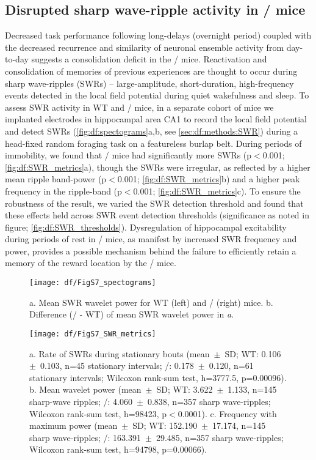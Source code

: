 \subsection{Disrupted sharp wave-ripple activity in \df/ mice}
\label{sec:df:results:SWR}
Decreased task performance following long-delays (overnight period) coupled with the decreased recurrence and similarity of neuronal ensemble activity from day-to-day suggests a consolidation deficit in the \df/ mice. Reactivation and consolidation of memories of previous experiences are thought to occur during sharp wave-ripples (SWRs) -- large-amplitude, short-duration, high-frequency events detected in the local field potential \citep{Buzsaki2015, Diba2007, Dupret2010a, Foster2006, Jadhav2012, Kudrimoti1999, Wilson1994} during quiet wakefulness and sleep. To assess SWR activity in WT and \df/ mice, in a separate cohort of mice we implanted electrodes in hippocampal area CA1 to record the local field potential and detect SWRs (\autoref{fig:df:spectograms}a,b, see \autoref{sec:df:methods:SWR}) during a head-fixed random foraging task on a featureless burlap belt. During periods of immobility, we found that \df/ mice had significantly more SWRs (p$<$0.001; \autoref{fig:df:SWR_metrics}a), though the SWRs were irregular, as reflected by a higher mean ripple band-power (p$<$0.001; \autoref{fig:df:SWR_metrics}b) and a higher peak frequency in the ripple-band (p$<$0.001; \autoref{fig:df:SWR_metrics}c). To ensure the robustness of the result, we varied the SWR detection threshold and found that these effects held across SWR event detection thresholds (significance as noted in figure; \autoref{fig:df:SWR_thresholds}). Dysregulation of hippocampal excitability during periods of rest in \df/ mice, as manifest by increased SWR frequency and power, provides a possible mechanism behind the failure to efficiently retain a memory of the reward location by the \df/ mice.

\begin{figure}
	\centering
	\texttt{[image: df/FigS7\_spectograms]}
	\caption[Sharp wave-ripple spectrograms in WT and \df/ mice]{a. Mean SWR wavelet power for WT (left) and \df/ (right) mice.
	b. Difference (\df/ - WT) of mean SWR wavelet power in \emph{a}.}
	\label{fig:df:spectograms}
\end{figure}

\begin{figure}
	\centering
	\texttt{[image: df/FigS7\_SWR\_metrics]}
	\caption[Rate and power of SWRs in WT and \df/ mice]{a. Rate of SWRs during stationary bouts (mean~$\pm$~SD; WT: 0.106~$\pm$~0.103, n=45 stationary intervals; \df/: 0.178~$\pm$~0.120, n=61 stationary intervals; Wilcoxon rank-sum test, h=3777.5, p=0.00096).
	b. Mean wavelet power (mean~$\pm$~SD; WT: 3.622~$\pm$~1.133, n=145 sharp-wave ripples; \df/: 4.060~$\pm$~0.838, n=357 sharp wave-ripples; Wilcoxon rank-sum test, h=98423, p$<$0.0001).
	c. Frequency with maximum power (mean~$\pm$~SD; WT: 152.190~$\pm$~17.174, n=145 sharp wave-ripples; \df/: 163.391~$\pm$~29.485, n=357 sharp wave-ripples; Wilcoxon rank-sum test, h=94798, p=0.00066).}
	\label{fig:df:SWR_metrics}
\end{figure}


